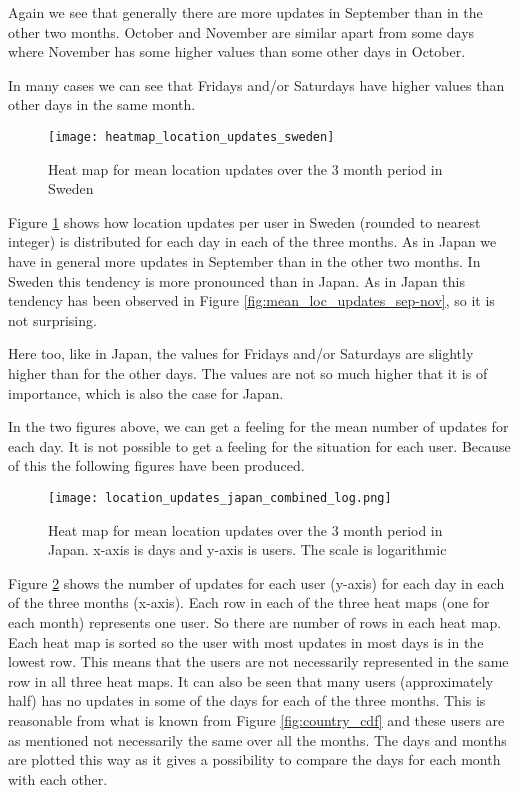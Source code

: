 Again we see that generally there are more updates in September than in the other two months. October and November are similar apart from some days where November has some higher values than some other days in October. 

In many cases we can see that Fridays and/or Saturdays have higher values than other days in the same month. 

\begin{figure}[H]
    \hspace*{-1.5cm}
    \centering
    \texttt{[image: heatmap\_location\_updates\_sweden]}
    \caption{Heat map for mean location updates over the 3 month period in Sweden}
    \label{fig:heatmap_swe}
\end{figure}

Figure \ref{fig:heatmap_swe} shows how location updates per user in Sweden (rounded to nearest integer) is distributed for each day in each of the three months. As in Japan we have in general more updates in September than in the other two months. In Sweden this tendency is more pronounced than in Japan. As in Japan this tendency has been observed in Figure \ref{fig:mean_loc_updates_sep-nov}, so it is not surprising.  
 
Here too, like in Japan, the values for Fridays and/or Saturdays are slightly higher than for the other days. The values are not so much higher that it is of importance, which is also the case for Japan. 

In the two figures above, we can get a feeling for the mean number of updates for each day. It is not possible to get a feeling for the situation for each user. Because of this the following figures have been produced. 

\begin{figure}[H]
    \hspace*{-1.5cm}
    \centering
    \texttt{[image: location\_updates\_japan\_combined\_log.png]}
    \caption{Heat map for mean location updates over the 3 month period in Japan. x-axis is days and y-axis is users. The scale is logarithmic}
    \vspace{-12pt}
    \label{fig:heatmap_japan_combined}
\end{figure}
Figure \ref{fig:heatmap_japan_combined} shows the number of updates for each user (y-axis) for each day in each of the three months (x-axis). Each row in each of the three heat maps (one for each month) represents one user. So there are \numberUsersJapan{} number of rows in each heat map.  Each heat map is sorted so the user with most updates in most days is in the lowest row. This means that the users are not necessarily represented in the same row in all three heat maps. It can also be seen that many users (approximately half) has no updates in some of the days for each of the three months. This is reasonable from what is known from Figure \ref{fig:country_cdf} and these users are as mentioned not necessarily the same over all the months. 
The days and months are plotted this way as it gives a possibility to compare the days for each month with each other. 

